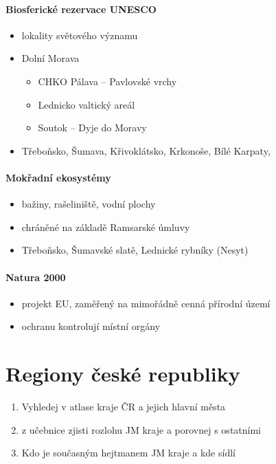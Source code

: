 \paragraph{Biosferické rezervace UNESCO}
\begin{itemize}
\item lokality světového významu
\item Dolní Morava
	\begin{itemize}
	\item CHKO Pálava -- Pavlovské vrchy
	\item Lednicko valtický areál
	\item Soutok -- Dyje do Moravy
	\end{itemize}
\item Třeboňsko, Šumava, Křivoklátsko, Krkonoše, Bílé Karpaty, 
\end{itemize}

\paragraph{Mokřadní ekosystémy}
\begin{itemize}
\item bažiny, rašeliniště, vodní plochy
\item chráněné na základě Ramsarské úmluvy
\item Třeboňsko, Šumavské slatě, Lednické rybníky (Nesyt)
\end{itemize}

\paragraph{Natura 2000}
\begin{itemize}
\item projekt EU, zaměřený na mimořádně cenná přírodní území
\item ochranu kontrolují místní orgány
\end{itemize}

\newpage

\section{Regiony české republiky}
\begin{enumerate}
\item Vyhledej v atlase kraje ČR a  jejich hlavní města
\item z učebnice zjisti rozlohu JM kraje a porovnej s ostatními
\item Kdo je současným hejtmanem JM kraje a kde sídlí
\end{enumerate}


